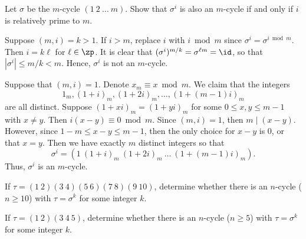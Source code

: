 \begin{specialexercise}\label{ex1.3.11}
    Let $\sigma$ be the $m$-cycle $(1\ 2\ \dots\ m)$. Show that $\sigma^i$ is also an $m$-cycle if and only if $i$ is relatively prime to $m$.
\end{specialexercise}

\begin{solitem}
    \item [\rightimp] Suppose $(m, i) = k > 1$. If $i > m$, replace $i$ with $i \bmod m$ since $\sigma^i = \sigma^{i \bmod m}$. Then $i = k\ell$ for $\ell \in \zp$. It is clear that $(\sigma^i)^{m/k} = \sigma^{\ell m} = \id$, so that $|\sigma^i| \leq m/k < m$. Hence, $\sigma^i$ is not an $m$-cycle.
    \item [\leftimp] Suppose that $(m, i) = 1$. Denote $x_m \equiv x \bmod m$. We claim that the integers
    \[1_m, (1 + i)_m, (1 + 2i)_m, \ldots, (1 + (m - 1)i)_m\]
    are all distinct. Suppose $(1 + xi)_m = (1 + yi)_m$ for some $0 \leq x, y \leq m - 1$ with $x \neq y$. Then $i(x - y) \equiv 0 \bmod m$. Since $(m, i) = 1$, then $m \mid (x - y)$. However, since $1 - m \leq x - y \leq m - 1$, then the only choice for $x - y$ is 0, or that $x = y$. Then we have exactly $m$ distinct integers so that
    \[\sigma^i = (1\ (1 + i)_m\ (1 + 2i)_m\ \ldots\ (1 + (m - 1)i)_m).\]
    Thus, $\sigma^i$ is an $m$-cycle.
\end{solitem}

\begin{exercise} \label{ex1.3.12}
    \begin{subproblems}
        \item If $\tau = (1\ 2)(3\ 4)(5\ 6)(7\ 8)(9\ 10)$, determine whether there is an $n$-cycle ($n \ge 10$) with $\tau = \sigma^k$ for some integer $k$.
        \item If $\tau = (1\ 2)(3\ 4\ 5)$, determine whether there is an $n$-cycle ($n \ge 5$) with $\tau = \sigma^k$ for some integer $k$.
    \end{subproblems}
\end{exercise}

